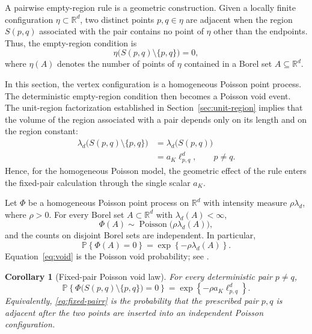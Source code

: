 \documentclass[a4paper,fleqn]{cas-dc}
\numberwithin{equation}{section}
\newcommand{\R}{\mathds{R}}
\newcommand{\Pp}{\mathds{P}}
\newcommand{\1}{\mathds{1}}
\newcommand{\ellpq}{\ell_{p,q}}
\newcommand{\0}{\mathbf{0}}
\newtheorem{corollary}[theorem]{Corollary}
\begin{document}
A pairwise empty-region rule is a geometric
construction. Given a locally finite configuration
\(\eta\subset\R^d\), two distinct points \(p,q\in\eta\) are adjacent
when the region \(S(p,q)\) associated with the pair contains no point
of \(\eta\) other than the endpoints. Thus, the empty-region condition
is
\begin{equation}
\eta\bigl(S(p,q)\setminus\{p,q\}\bigr)=0,
\end{equation}
where \(\eta(A)\) denotes the
number of points of \(\eta\) contained in a Borel set \(A\subseteq\R^d\).

In this section, the vertex configuration is a homogeneous Poisson
point process. The deterministic empty-region condition then becomes a
Poisson void event. The unit-region factorization established in
Section~\ref{sec:unit-region} implies that the volume of the region
associated with a pair depends only on its length and on the region
constant:
\begin{equation}\label{eq:section-factorization}
\begin{aligned}
\lambda_d\bigl(S(p,q)\setminus\{p,q\}\bigr)
&=\lambda_d\bigl(S(p,q)\bigr)\\
&=a_K\ellpq^d,\qquad p\neq q.
\end{aligned}
\end{equation}
Hence, for the homogeneous Poisson model, the geometric effect of the
rule enters the fixed-pair calculation through the single scalar
\(a_K\).

Let \(\Phi\) be a homogeneous Poisson point process on \(\R^d\) with
intensity measure \(\rho\lambda_d\), where \(\rho>0\). For every Borel
set \(A\subset\R^d\) with \(\lambda_d(A)<\infty\),
\begin{equation}\label{eq:poisson}
\Phi(A)
\sim
\operatorname{Poisson}\bigl(\rho\lambda_d(A)\bigr),
\end{equation}
and the counts on disjoint Borel sets are independent. In particular,
\begin{equation}\label{eq:void}
\Pp\left\{\Phi(A)=0\right\}
=
\exp\left\{-\rho\lambda_d(A)\right\}.
\end{equation}
Equation~\eqref{eq:void} is the Poisson void probability; see
\citep{last2017lectures,baccelli2010stochastic}.



\begin{corollary}[Fixed-pair Poisson void law]
\label{cor:fixed-pair}
For every deterministic pair \(p\neq q\),
\begin{equation}\label{eq:fixed-pairr}
\Pp\left\{\Phi\bigl(S(p,q) \setminus \{p,q\}\bigr)=0\right\}
=
\exp\left\{
-\rho a_K \ellpq^{d}
\right\}.
\end{equation}
Equivalently, \eqref{eq:fixed-pairr} is the probability that the
prescribed pair \(p,q\) is adjacent after the two points are inserted
into an independent Poisson configuration.
\end{corollary}
\end{document}
